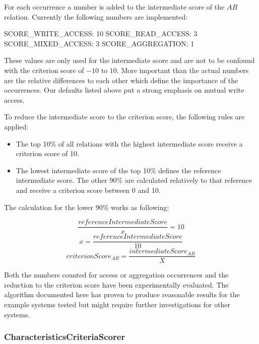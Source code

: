 For each occurrence a number is added to the intermediate score of the $AB$ relation. Currently the following numbers are implemented:

SCORE\_WRITE\_ACCESS: 10 \newline
SCORE\_READ\_ACCESS: 3  \newline
SCORE\_MIXED\_ACCESS: 3 \newline 
SCORE\_AGGREGATION: 1 \newline 

These values are only used for the intermediate score and are not to be confound with the criterion score of $-10$ to $10$. More important than the actual numbers are the relative differences to each other which define the importance of the occurrences. Our defaults listed above put a strong emphasis on mutual write access. 

To reduce the intermediate score to the criterion score, the following rules are applied:

\begin{itemize}
	\item The top 10\% of all relations with the highest intermediate score receive a criterion score of 10.
	\item The lowest intermediate score of the top 10\% defines the reference intermediate score. The other 90\% are calculated relatively to that reference and receive a criterion score between 0 and 10.
\end{itemize}

The calculation for the lower 90\% works as following:


\begin{equation}
\frac{referenceIntermediateScore}{x} = 10
\end{equation}
\begin{equation}
x = \frac{referenceIntermediateScore}{10}
\end{equation}
\begin{equation}
criterionScore_{AB} = \frac{intermediateScore_{AB}}{X}
\end{equation}

Both the numbers counted for access or aggregation occurrences and the reduction to the criterion score have been experimentally evaluated. The algorithm documented here has proven to produce reasonable results for the example systems tested but might require further investigations for other systems. 

\subsubsection{CharacteristicsCriteriaScorer}

